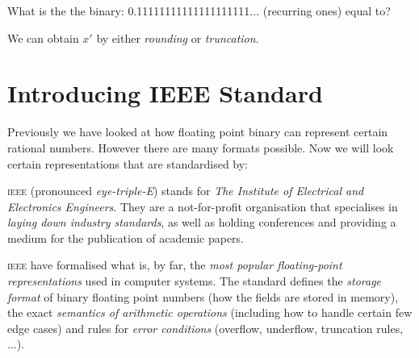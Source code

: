 \frmrule

\begin{example}
What is the the binary: 0.11111111111111111111... (recurring ones) equal to?
\end{example}

We can obtain $x'$ by either \textit{rounding} or \textit{truncation}.


\frmrule

\section{Introducing IEEE Standard}

Previously we have looked at how floating point binary can represent certain rational numbers. 
However there are many formats possible. 
Now we will look certain representations that are standardised by:


\textsc{ieee} (pronounced \textit{eye-triple-E})
stands for \textit{The Institute of Electrical and Electronics Engineers}. 
They are a not-for-profit organisation that specialises in \textit{laying down industry standards}, 
as well as holding conferences and providing a medium for the publication of academic papers. 

\textsc{ieee} have formalised what is, by far, the \textit{most popular floating-point representations}
used in computer systems. The standard defines the \textit{storage format} of binary floating point numbers 
(how the fields are stored in memory), the exact \textit{semantics of arithmetic operations} (including how to handle 
certain few edge cases) and rules for \textit{error conditions}
(overflow, underflow, truncation rules, ...).






